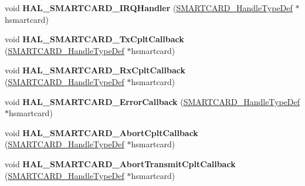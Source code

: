 \begin{DoxyCompactItemize}
\mbox{\label{group___s_m_a_r_t_c_a_r_d___exported___functions___group2_gaa00666aff489f8f1e3a3e45e54a3724e}} 
void {\bfseries H\+A\+L\+\_\+\+S\+M\+A\+R\+T\+C\+A\+R\+D\+\_\+\+I\+R\+Q\+Handler} (\hyperlink{struct_s_m_a_r_t_c_a_r_d___handle_type_def}{S\+M\+A\+R\+T\+C\+A\+R\+D\+\_\+\+Handle\+Type\+Def} $\ast$hsmartcard)
\item 
\mbox{\label{group___s_m_a_r_t_c_a_r_d___exported___functions___group2_ga03a84fe3aaef53dc1adaac6090dc1c36}} 
void {\bfseries H\+A\+L\+\_\+\+S\+M\+A\+R\+T\+C\+A\+R\+D\+\_\+\+Tx\+Cplt\+Callback} (\hyperlink{struct_s_m_a_r_t_c_a_r_d___handle_type_def}{S\+M\+A\+R\+T\+C\+A\+R\+D\+\_\+\+Handle\+Type\+Def} $\ast$hsmartcard)
\item 
\mbox{\label{group___s_m_a_r_t_c_a_r_d___exported___functions___group2_ga4b5974828bb3e67e9dd1637758aca455}} 
void {\bfseries H\+A\+L\+\_\+\+S\+M\+A\+R\+T\+C\+A\+R\+D\+\_\+\+Rx\+Cplt\+Callback} (\hyperlink{struct_s_m_a_r_t_c_a_r_d___handle_type_def}{S\+M\+A\+R\+T\+C\+A\+R\+D\+\_\+\+Handle\+Type\+Def} $\ast$hsmartcard)
\item 
\mbox{\label{group___s_m_a_r_t_c_a_r_d___exported___functions___group2_ga437a5bdddcc9e217e62729161dc04b1e}} 
void {\bfseries H\+A\+L\+\_\+\+S\+M\+A\+R\+T\+C\+A\+R\+D\+\_\+\+Error\+Callback} (\hyperlink{struct_s_m_a_r_t_c_a_r_d___handle_type_def}{S\+M\+A\+R\+T\+C\+A\+R\+D\+\_\+\+Handle\+Type\+Def} $\ast$hsmartcard)
\item 
\mbox{\label{group___s_m_a_r_t_c_a_r_d___exported___functions___group2_ga9ee547f00aef8bfee707ceb5628b4b6a}} 
void {\bfseries H\+A\+L\+\_\+\+S\+M\+A\+R\+T\+C\+A\+R\+D\+\_\+\+Abort\+Cplt\+Callback} (\hyperlink{struct_s_m_a_r_t_c_a_r_d___handle_type_def}{S\+M\+A\+R\+T\+C\+A\+R\+D\+\_\+\+Handle\+Type\+Def} $\ast$hsmartcard)
\item 
\mbox{\label{group___s_m_a_r_t_c_a_r_d___exported___functions___group2_ga75e45d1b3633abe9b69d2fc5afd06e30}} 
void {\bfseries H\+A\+L\+\_\+\+S\+M\+A\+R\+T\+C\+A\+R\+D\+\_\+\+Abort\+Transmit\+Cplt\+Callback} (\hyperlink{struct_s_m_a_r_t_c_a_r_d___handle_type_def}{S\+M\+A\+R\+T\+C\+A\+R\+D\+\_\+\+Handle\+Type\+Def} $\ast$hsmartcard)

\end{DoxyCompactItemize}
